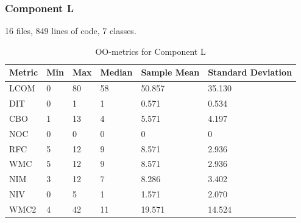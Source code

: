 \subsubsection{Component L}
16 files, 849 lines of code, 7 classes.

\begin{table}[]
\centering
\caption{OO-metrics for Component L}
\label{tab:oometrics-log}
\begin{tabular}{|l|l|l|l|l|l|}
\hline
\textbf{Metric} & \textbf{Min} & \textbf{Max} & \textbf{Median} & \textbf{Sample Mean} & \textbf{Standard Deviation} \\ \hline
LCOM            & 0            & 80           & 58              & 50.857               & 35.130                      \\ \hline
DIT             & 0            & 1            & 1               & 0.571                & 0.534                       \\ \hline
CBO             & 1            & 13           & 4               & 5.571                & 4.197                       \\ \hline
NOC             & 0            & 0            & 0               & 0                    & 0                           \\ \hline
RFC             & 5            & 12           & 9               & 8.571                & 2.936                       \\ \hline
WMC             & 5            & 12           & 9               & 8.571                & 2.936                       \\ \hline
NIM             & 3            & 12           & 7               & 8.286                & 3.402                       \\ \hline
NIV             & 0            & 5            & 1               & 1.571                & 2.070                       \\ \hline
WMC2            & 4            & 42          & 11              & 19.571                 & 14.524                      \\ \hline
\end{tabular}
\end{table}



